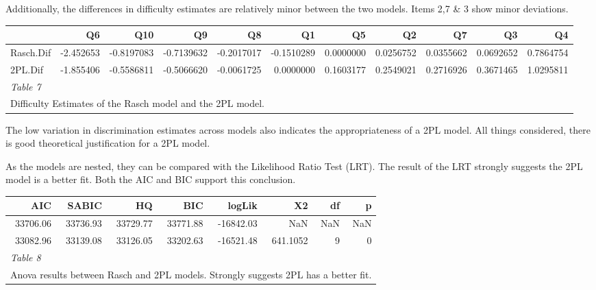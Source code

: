 \documentclass[
  man,floatsintext]{apa6}
\begin{document}
Additionally, the differences in difficulty estimates are relatively minor between the two models. Items 2,7 \& 3 show minor deviations.

\begin{table}[H]
\centering\begingroup\fontsize{7}{9}\selectfont

\begin{tabular}{lrrrrrrrrrr}
\toprule
  & Q6 & Q10 & Q9 & Q8 & Q1 & Q5 & Q2 & Q7 & Q3 & Q4\\
\midrule
Rasch.Dif & -2.452653 & -0.8197083 & -0.7139632 & -0.2017017 & -0.1510289 & 0.0000000 & 0.0256752 & 0.0355662 & 0.0692652 & 0.7864754\\
2PL.Dif & -1.855406 & -0.5586811 & -0.5066620 & -0.0061725 & 0.0000000 & 0.1603177 & 0.2549021 & 0.2716926 & 0.3671465 & 1.0295811\\
\bottomrule
\multicolumn{11}{l}{\rule{0pt}{1em}\textit{Table 7}}\\
\multicolumn{11}{l}{\rule{0pt}{1em}Difficulty Estimates of the Rasch model and the 2PL model.}\\
\end{tabular}
\endgroup{}
\end{table}

The low variation in discrimination estimates across models also indicates the appropriateness of a 2PL model. All things considered, there is good theoretical justification for a 2PL model.

As the models are nested, they can be compared with the Likelihood Ratio Test (LRT). The result of the LRT strongly suggests the 2PL model is a better fit. Both the AIC and BIC support this conclusion.

\begin{table}[H]
\centering\begingroup\fontsize{7}{9}\selectfont

\begin{tabular}{rrrrrrrr}
\toprule
AIC & SABIC & HQ & BIC & logLik & X2 & df & p\\
\midrule
33706.06 & 33736.93 & 33729.77 & 33771.88 & -16842.03 & NaN & NaN & NaN\\
33082.96 & 33139.08 & 33126.05 & 33202.63 & -16521.48 & 641.1052 & 9 & 0\\
\bottomrule
\multicolumn{8}{l}{\rule{0pt}{1em}\textit{Table 8}}\\
\multicolumn{8}{l}{\rule{0pt}{1em}Anova results between Rasch and 2PL models. Strongly suggests 2PL has a better fit.}\\
\end{tabular}
\endgroup{}
\end{table}
\end{document}
